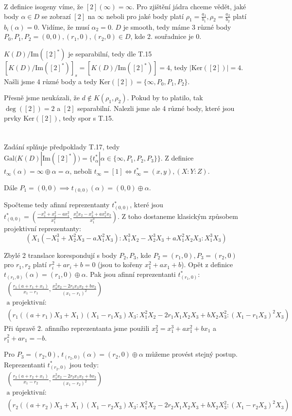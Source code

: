 \documentclass[12pt, a4paper]{article}
\begin{document}
Z definice isogeny víme, že $[2](\infty) = \infty$. Pro zjištění jádra chceme vědět, jaké body $\alpha \in D$ se zobrazí $[2]$ na $\infty$ neboli pro jaké body platí $\rho_1 = \frac{a_1}{b_1}, \rho_2 = \frac{a_2}{b_2}$ platí $b_i(\alpha)=0$. Vidíme, že musí $\alpha_2 = 0$. $D$ je smooth, tedy máme $3$ různé body $P_0,P_1,P_2 = (0,0),(r_1,0),(r_2,0) \in D$, kde 2. souřadnice je 0.

$K(D)/\text{Im}([2]^*)$ je separabilní, tedy dle T.15 $[K(D)/\text{Im}([2]^*)]_s = [K(D)/\text{Im}([2]^*)] = 4$, tedy $|\text{Ker}([2])|=4$. Našli jsme 4 různé body a tedy $\text{Ker}([2]) = \{\infty, P_0, P_1, P_2\}$. 

Přesně jsme neukázali, že $d \notin K(\rho_1, \rho_2)$. Pokud by to platilo, tak $\deg([2]) = 2$ a $[2]$ separabilní. Nalezli jsme ale 4 různé body, které jsou prvky $\text{Ker}([2])$, tedy spor s T.15.

\section{}
Zadání splňuje předpoklady T.17, tedy $\text{Gal}(K(D)|\text{Im}([2]^*)) = \{t^*_\alpha| \alpha \in \{\infty, P_1, P_2, P_3\}\}$.
Z definice $t_\infty (\alpha) = \infty \oplus \alpha = \alpha$, neboli $t_\infty = [1] \iff t_\infty^* = (x,y), (X:Y:Z)$.

Dále $P_1 = (0,0) \implies t_{(0,0)}(\alpha) = (0,0) \oplus \alpha$.

Spočteme tedy afinní reprezentanty $t_{(0,0)}^*$, které jsou $t_{(0,0)}^* = \left( \frac{-x_1^3+x_2^2-ax_1^2}{x_1^2}, \frac{x_1^3x_2-x_2^3+ax_1^2x_2}{x_1^3} \right)$. Z toho dostaneme klasickým způsobem projektivní reprezentanty: 
\[(X_1(-X_1^3+X_2^2X_3-aX_1^2X_3) : X_1^3X_2-X_2^3X_3+aX_1^2X_2X_3 : X_1^3X_3) \]

Zbylé 2 translace korespondují s body $P_2,P_3$, kde $P_2 = (r_1, 0), P_3 = (r_2, 0)$ pro $r_1,r_2$ platí $r_i^2+ar_i+b = 0$ (jsou to kořeny $x_1^2+ax_1+b$). Opět z definice $t_{(r_1,0)}(\alpha) = (r_1,0) \oplus \alpha$. Pak jsou afinní reprezentanti $t_{(r_1,0)}^*$: 
\begin{gather*}
\left(\frac{r_1(a+r_1+x_1)}{x_1-r_1}, \frac{x_1^2x_2-2r_1x_1x_2 + bx_2}{(x_1-r_1)^2} \right )\\
\text{a projektivní:}\\
\left(r_1((a+r_1)X_3 + X_1)(X_1-r_1X_3)X_3 : X_1^2X_2-2r_1X_1X_2X_3+bX_2X_3^2 : (X_1-r_1X_3)^2X_3 \right)
\end{gather*}
Při úpravě 2. afinního reprezentanta jsme použili $x_2^2 = x_1^3+ax_1^2+bx_1$ a $r_1^2+ar_1 = -b$.

Pro $P_3 = (r_2,0)$, $t_{(r_2,0)}(\alpha) = (r_2, 0) \oplus \alpha$ můžeme provést stejný postup. Reprezentanti $t_{(r_2,0)}^*$ jsou tedy:
\begin{gather*}
\left(\frac{r_2(a+r_2+x_1)}{x_1-r_2}, \frac{x_1^2x_2-2r_2x_1x_2 + bx_2}{(x_1-r_2)^2} \right )\\
\text{a projektivní:}\\
\left(r_2((a+r_2)X_3 + X_1)(X_1-r_2X_3)X_3 : X_1^2X_2-2r_2X_1X_2X_3+bX_2X_3^2 : (X_1-r_2X_3)^2X_3 \right)
\end{gather*}
\end{document}
